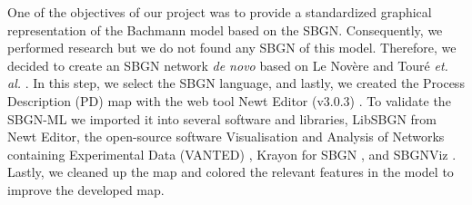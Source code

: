 One of the objectives of our project was to provide a standardized graphical representation of the Bachmann model based on the SBGN. Consequently, we performed research but we do not found any SBGN of this model. Therefore, we decided to create an SBGN network \textit{de novo} based on Le Novère \cite{sbgnnovere} and Touré \textit{et. al.} \cite{sbgntoure}. In this step, we select the SBGN language, and lastly, we created the Process Description (PD) map with the web tool Newt Editor (v3.0.3) \cite{newteditor}. To validate the SBGN-ML we imported it into several software and libraries, LibSBGN from Newt Editor, the open-source software Visualisation and Analysis of Networks containing Experimental Data (VANTED) \cite{vanted}, Krayon for SBGN \cite{krayon}, and SBGNViz \cite{sbgnviz}. Lastly, we cleaned up the map and colored the relevant features in the model to improve the developed map.